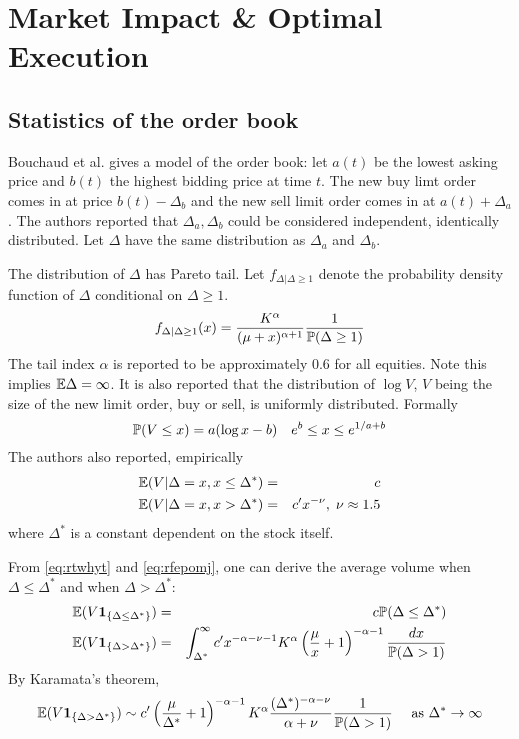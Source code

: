 \chapter{Market Impact \& Optimal Execution}
\section{Statistics of the order book}
Bouchaud et al. \cite{BouchaudMezardPotters2002} gives a model of the
order book: let $a(t)$ be the lowest asking price and $b(t)$ the
highest bidding price at time $t$. The new buy limt order comes in at
price $b(t) - \Delta_b$ and the new sell limit order comes in at
$a(t) + \Delta_a$. The authors reported that $\Delta_a, \Delta_b$
could be considered independent, identically distributed. Let
$\Delta$ have the same distribution as $\Delta_a$ and $\Delta_b$.

The distribution of $\Delta$ has Pareto tail. Let
$f_{\Delta | \Delta \geq 1}$ denote the probability density function
of $\Delta$ conditional on $\Delta \geq 1$.
\begin{equation}
  \label{eq:rtwhyt}
  f_{\Delta | \Delta \geq 1}(x) = {
    K^\alpha
    \over
    (\mu + x)^{\alpha + 1}
  } \frac{1}{\P(\Delta \geq 1)}
\end{equation}
The tail index $\alpha$ is reported to be approximately $0.6$ for all
equities. Note this implies $\mathbb{E} \Delta = \infty$. It is also reported
that the distribution of $\log V$, $V$ being the size of the new limit
order, buy or sell, is uniformly distributed. Formally
\begin{equation}
  \label{eq:pojfg}
  \P(V \leq x) = a(\log x - b)
  \quad
  e^b \leq x \leq e^{1/a + b}
\end{equation}
The authors also reported, empirically
\begin{eqnarray}
  \mathbb{E}(V|\Delta = x, x \leq \Delta^*) &=& c \nonumber \\
  \mathbb{E}(V|\Delta = x, x > \Delta^*) &=& c' x^{-\nu},\; \nu \approx 1.5 \label{eq:rfepomj}
\end{eqnarray}
where $\Delta^*$ is a constant dependent on the stock itself.

From \eqref{eq:rtwhyt} and \eqref{eq:rfepomj}, one can derive the average
volume when $\Delta \leq \Delta^*$ and when $\Delta > \Delta^*$:
\begin{eqnarray*}
  \mathbb{E}(V \mathbf{1}_{\{\Delta \leq \Delta^*\}}) &=& c \mathbb{P}(\Delta \leq \Delta^*) \\
  \mathbb{E}(V \mathbf{1}_{\{\Delta > \Delta^*\}}) &=& \int_{\Delta^*}^\infty c' x^{
                                  -\alpha - \nu - 1
                                  } K^\alpha \left(
                                  \frac{\mu}{x} + 1
                                  \right)^{-\alpha - 1}
                                  \frac{dx}{\mathbb{P}(\Delta > 1)}
\end{eqnarray*}
By Karamata's theorem,
\[
  \mathbb{E}(V \mathbf{1}_{\{\Delta > \Delta^*\}}) \sim c' \left(
    {\mu \over \Delta^*} + 1
  \right)^{-\alpha - 1} K^\alpha
  {(\Delta^*)^{-\alpha-\nu} \over \alpha + \nu}
  {1 \over  \mathbb{P} (\Delta > 1)}
  \quad
  \text{ as }
  \Delta^* \to \infty
\]


